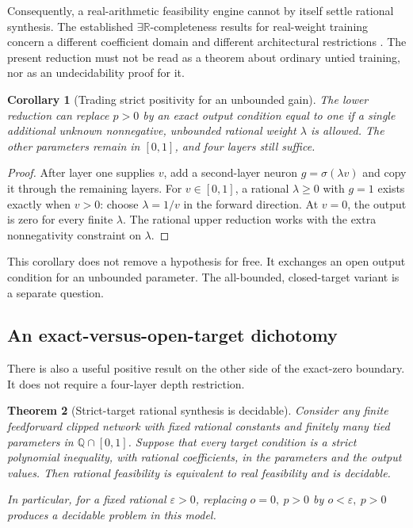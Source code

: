 \documentclass[11pt,letterpaper]{article}
\numberwithin{equation}{section}
\newtheorem{theorem}{Theorem}[section]
\newtheorem{corollary}[theorem]{Corollary}
\theoremstyle{definition}
\theoremstyle{remark}
\newcommand{\Q}{\mathbb Q}
\newcommand{\R}{\mathbb R}
\begin{document}
Consequently, a real-arithmetic feasibility engine cannot by itself settle
rational synthesis. The established $\exists\R$-completeness results for
real-weight training concern a different coefficient domain and different
architectural restrictions \cite{b62s15-real-training}. The present reduction
must not be read as a theorem about ordinary untied training, nor as an
undecidability proof for it.

\begin{corollary}[Trading strict positivity for an unbounded gain]
The lower reduction can replace $p>0$ by an exact output condition equal to
one if a single additional unknown nonnegative, unbounded rational weight
$\lambda$ is allowed. The other parameters remain in $[0,1]$, and four
layers still suffice.
\end{corollary}

\begin{proof}
After layer one supplies $v$, add a second-layer neuron
$g=\sigma(\lambda v)$ and copy it through the remaining layers. For
$v\in[0,1]$, a rational $\lambda\geq0$ with $g=1$ exists exactly when
$v>0$: choose $\lambda=1/v$ in the forward direction. At $v=0$, the
output is zero for every finite $\lambda$. The rational upper reduction
works with the extra nonnegativity constraint on $\lambda$.
\end{proof}

This corollary does not remove a hypothesis for free. It exchanges an open
output condition for an unbounded parameter. The all-bounded, closed-target
variant is a separate question.

\subsection{An exact-versus-open-target dichotomy}

There is also a useful positive result on the other side of the exact-zero
boundary. It does not require a four-layer depth restriction.

\begin{theorem}[Strict-target rational synthesis is decidable]\label{pqc:pm:thm:strict}
Consider any finite feedforward clipped network with fixed rational constants
and finitely many tied parameters in $\Q\cap[0,1]$. Suppose that every target
condition is a strict polynomial inequality, with rational coefficients, in
the parameters and the output values. Then rational feasibility is equivalent
to real feasibility and is decidable.

In particular, for a fixed rational $\varepsilon>0$, replacing
$o=0,\ p>0$ by $o<\varepsilon,\ p>0$ produces a decidable problem in this
model.
\end{theorem}
\end{document}
